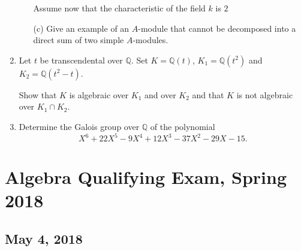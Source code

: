 \documentclass{article}
\begin{document}
\begin{enumerate}
\begin{itemize}
        Assume now that the characteristic of the field \(k\) is \(2\)
        
        \item[(c)] Give an example of an \(A\)-module that cannot be decomposed into a direct sum of two simple \(A\)-modules.
    \end{itemize}

    \item Let \(t\) be transcendental over \(\mathbb{Q}\). Set \(K=\mathbb{Q}(t)\), \(K_{1}=\mathbb{Q}(t^{2})\) and \(K_{2}=\mathbb{Q}(t^{2}-t)\).
    
    Show that \(K\) is algebraic over \(K_{1}\) and over \(K_{2}\) and that \(K\) is not algebraic over \(K_{1}\cap K_{2}\).

    \item Determine the Galois group over \(\mathbb{Q}\) of the polynomial
    \[X^{6}+22X^{5}-9X^{4}+12X^{3}-37X^{2}-29X-15.\]
\end{enumerate}

\section*{Algebra Qualifying Exam, Spring 2018}
\subsection*{May 4, 2018}
\end{document}
